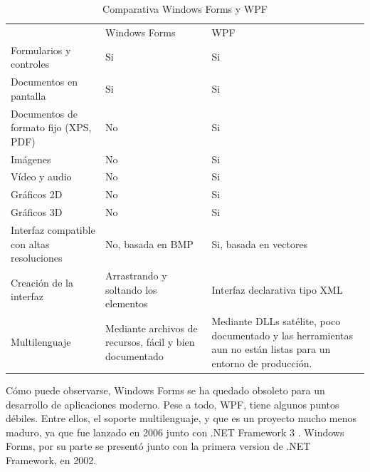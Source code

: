 \begin{table}[H]
	\begin{center}
		\begin{tabular}{|p{5cm} | p{4cm} | p{4cm}|}
			\rowcolor{darkgray}                         & \color{white}Windows Forms               & \color{white}WPF \\
			Formularios y controles                     & Si                                       & Si \\
			Documentos en pantalla                      & Si                                       & Si \\
			Documentos de formato fijo (XPS, PDF)       & No                                       & Si \\
			Im\'{a}genes                                & No                                       & Si \\
			V\'{i}deo y audio                           & No                                       & Si \\
			Gr\'{a}ficos 2D                             & No                                       & Si \\
			Gr\'{a}ficos 3D                             & No                                       & Si \\
			Interfaz compatible con altas resoluciones  & No, basada en BMP                        & Si, basada en vectores \\
			Creaci\'{o}n de la interfaz                 & Arrastrando y soltando los elementos     & Interfaz declarativa tipo XML \\
			Multilenguaje                               & Mediante archivos de recursos, f\'{a}cil y bien documentado & Mediante DLLs sat\'{e}lite, poco documentado y las herramientas aun no est\'{a}n listas para un entorno de producci\'{o}n. \\
			\hline
		\end{tabular}
	\end{center}
	\caption[Comparativa Windows Forms y WPF]{Comparativa Windows Forms y WPF}
	\label{ComparativaWPF}
\end{table}

C\'omo puede observarse, Windows Forms se ha quedado obsoleto para un desarrollo de aplicaciones moderno.
Pese a todo, WPF, tiene algunos puntos d\'ebiles. Entre ellos, el soporte multilenguaje, y que es un proyecto
mucho menos maduro, ya que fue lanzado en 2006 junto con .NET Framework 3 \cite{WPF:Overview}. Windows Forms,
por su parte se present\'o junto con la primera version de .NET Framework, en 2002.

